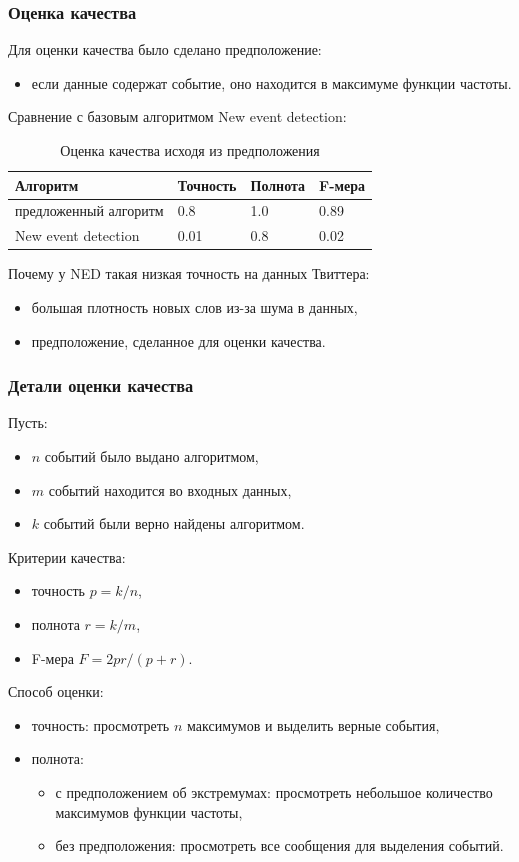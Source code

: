 \documentclass[10pt,pdf,hyperref={unicode}]{beamer}
\begin{document}
\begin{frame}
  \frametitle{Оценка качества}
  Для оценки качества было сделано предположение:
  \begin{itemize}
  \item если данные содержат событие, оно находится в максимуме функции частоты.
  \end{itemize}
  
  Сравнение с базовым алгоритмом New event detection:
  	\begin{table}[h]
	\centering
	\begin{tabular}{ l l l l}
	Алгоритм & Точность & Полнота & F-мера \\ \hline
	предложенный алгоритм  & 0.8 & 1.0 & 0.89 \\ 
	New event detection & 0.01 & 0.8 & 0.02 \\ 
	\end{tabular}
		\caption{Оценка качества исходя из предположения}
	\end{table}
	
	Почему у NED такая низкая точность на данных Твиттера:
	\begin{itemize}
	\item большая плотность новых слов из-за шума в данных,
	\item предположение, сделанное для оценки качества.
	\end{itemize}
	
\end{frame}

\begin{frame}
  \frametitle{Детали оценки качества}
  Пусть:
  \begin{itemize}
  \item $n$ событий было выдано алгоритмом,
  \item $m$ событий находится во входных данных,
  \item $k$ событий были верно найдены алгоритмом.
  \end{itemize}
  
  Критерии качества:
  \begin{itemize}
  \item точность $p = k/n$,
  \item полнота $r = k/m$,
  \item F-мера $F = 2pr/(p+r)$.
  \end{itemize}
  
  Способ оценки:
  \begin{itemize}
  \item точность: просмотреть $n$ максимумов и выделить верные события,
  \item полнота: 
  \begin{itemize}
  \item с предположением об экстремумах: просмотреть небольшое количество максимумов функции частоты,
  \item без предположения: просмотреть все сообщения для выделения событий.
  \end{itemize}
  \end{itemize}
  
\end{frame}
\end{document}
